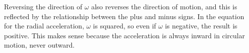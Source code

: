 Reversing the direction of $\omega$ also reverses the direction of 
motion, and this is reflected by the relationship between the plus and minus signs.
 In the equation for the radial acceleration, $\omega$ is squared, so even if $\omega$
 is negative, the
 result is positive. This makes sense because the acceleration is always inward in
 circular motion, never outward.



